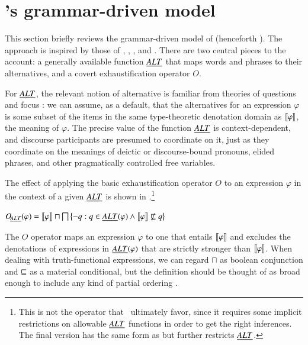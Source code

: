 \documentclass[leqno,12pt]{article}
\begin{document}

\section{\CFS's grammar-driven model}\label{sec:cfs}


This section briefly reviews the grammar-driven model of
\citet{ChierchiaFoxSpector08} (henceforth \CFS).  The approach is
inspired by those of \citet{Chierchia01}, \citet{Sauerland01},
\citet{Spector:2007}, and \citet{Fox:2007,Fox:2009}. There are two
central pieces to the account: a generally available function $\emph{ALT}$
that maps words and phrases to their alternatives, and a covert
exhaustification operator $O$.

For $\emph{ALT}$, the relevant notion of alternative is familiar from
theories of questions and focus \citep{Groenendijk84,Rooth85,Rooth92}:
we can assume, as a default, that the alternatives for an expression
$\varphi$ is some subset of the items in the same type-theoretic
denotation domain as $\llbracket\varphi\rrbracket$, the meaning of $\varphi$.  The
precise value of the function $\emph{ALT}$ is context-dependent, and
discourse participants are presumed to coordinate on it, just as they
coordinate on the meanings of deictic or discourse-bound pronouns,
elided phrases, and other pragmatically controlled free variables.

The effect of applying the basic exhaustification operator $O$ to an
expression $\varphi$ in the context of a given $\emph{ALT}$ is shown in
\citep{Spector:2007,Fox:2007,Fox:2009,Magri:2009,ChierchiaFoxSpector08}.\footnote{This
  is not the operator that \CFS\ ultimately favor, since it
  requires some implicit restrictions on allowable $\emph{ALT}$ functions in
  order to get the right inferences.  The final version has the same
  form as  but further restricts $\emph{ALT}$.}
%
\begin{examples}
\item\label{def:O}
  $\OALT(\varphi) = 
  \sem{\varphi} \sqcap \bigsqcap\set{ -q : q \in \ALT(\varphi) \wedge \sem{\varphi} \not\entails q}$ 
\end{examples}
%
The $O$ operator maps an expression $\varphi$ to one that entails
$\llbracket\varphi\rrbracket$ and excludes the denotations of expressions in
$\emph{ALT}(\varphi)$ that are strictly stronger than $\llbracket\varphi\rrbracket$. When
dealing with truth-functional expressions, we can regard $\sqcap$ as
boolean conjunction and $\sqsubseteq$ as a material conditional, but the
definition should be thought of as broad enough to include any kind of
partial ordering .
\end{document}
